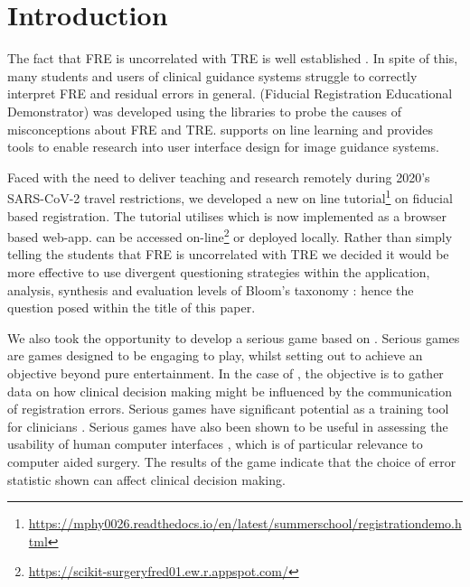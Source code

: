 \section{Introduction}
The fact that \gls{FRE} is uncorrelated with \gls{TRE} is well established 
\cite{fitzpatrick2009}. In spite of this, many students and users of clinical guidance systems struggle to 
correctly interpret \gls{FRE} and residual errors in general. 
\fred (Fiducial Registration Educational Demonstrator)
 \cite{stephen_thompson_2020_4314971} was developed using the 
\sksurgery \cite{PMID:32436132} libraries to probe the causes of misconceptions 
about \gls{FRE} and \gls{TRE}. \fred supports on line learning and provides tools to enable 
research into user interface design for image guidance systems. 

Faced with the need to deliver teaching and research remotely during 2020's {SARS-CoV-2}\cite{PMID:32123347}
travel restrictions, we 
developed a new on line tutorial\footnote{\href{https://mphy0026.readthedocs.io/en/latest/summerschool/registration_demo.html}{https://mphy0026.readthedocs.io/en/latest/summerschool/registration{\textunderscore}demo.html}}
on fiducial based registration. The tutorial utilises \fred which is now implemented as a browser based web-app. 
\fred can be accessed on-line\footnote{\href{https://scikit-surgeryfred01.ew.r.appspot.com/}{https://scikit-surgeryfred01.ew.r.appspot.com/}} or deployed locally.
Rather than simply telling the students that \gls{FRE} is uncorrelated with \gls{TRE} 
we decided it would be more effective to use divergent questioning strategies\cite{Tofade155} within the application, analysis, synthesis and 
evaluation levels of Bloom's taxonomy \cite{blooms_tax}: hence the question posed within the title of this paper. 

We also took the opportunity to develop a serious game based on \fredns. 
Serious games are games designed to be engaging to play, whilst setting out to achieve an objective
beyond pure entertainment. In the case of \fredns, the objective is to gather data on how clinical 
decision making might be influenced by the communication of registration errors. 
Serious games have significant potential 
as a training tool for clinicians \cite{PMID:28133947, serious-needle}. Serious games have also been shown to be 
useful in assessing the usability of human computer interfaces \cite{hci_games}, which is of particular
relevance to computer aided surgery. The results of the game indicate that the choice of error statistic shown can affect clinical decision making.  

